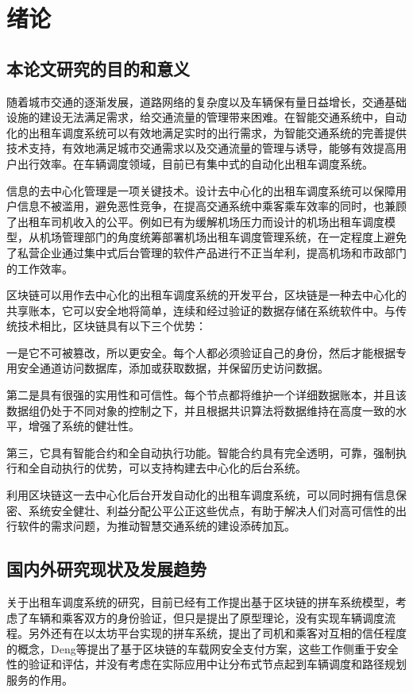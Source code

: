 \chapter{绪论}
\section{本论文研究的目的和意义}

随着城市交通的逐渐发展，道路网络的复杂度以及车辆保有量日益增长，交通基础设施的建设无法满足需求，给交通流量的管理带来困难。在智能交通系统中，自动化的出租车调度系统可以有效地满足实时的出行需求，为智能交通系统的完善提供技术支持，有效地满足城市交通需求以及交通流量的管理与诱导，能够有效提高用户出行效率。在车辆调度领域，目前已有集中式的自动化出租车调度系统。

信息的去中心化管理是一项关键技术。设计去中心化的出租车调度系统可以保障用户信息不被滥用，避免恶性竞争，在提高交通系统中乘客乘车效率的同时，也兼顾了出租车司机收入的公平。例如已有为缓解机场压力而设计的机场出租车调度模型，从机场管理部门的角度统筹部署机场出租车调度管理系统，在一定程度上避免了私营企业通过集中式后台管理的软件产品进行不正当牟利，提高机场和市政部门的工作效率。

区块链可以用作去中心化的出租车调度系统的开发平台，区块链是一种去中心化的共享账本，它可以安全地将简单，连续和经过验证的数据存储在系统软件中。与传统技术相比，区块链具有以下三个优势：

一是它不可被篡改，所以更安全。每个人都必须验证自己的身份，然后才能根据专用安全通道访问数据库，添加或获取数据，并保留历史访问数据。

第二是具有很强的实用性和可信性。每个节点都将维护一个详细数据账本，并且该数据组仍处于不同对象的控制之下，并且根据共识算法将数据维持在高度一致的水平，增强了系统的健壮性。

第三，它具有智能合约和全自动执行功能。智能合约具有完全透明，可靠，强制执行和全自动执行的优势，可以支持构建去中心化的后台系统。

利用区块链这一去中心化后台开发自动化的出租车调度系统，可以同时拥有信息保密、系统安全健壮、利益分配公平公正这些优点，有助于解决人们对高可信性的出行软件的需求问题，为推动智慧交通系统的建设添砖加瓦。


\section{国内外研究现状及发展趋势}
关于出租车调度系统的研究，目前已经有工作提出基于区块链的拼车系统模型，考虑了车辆和乘客双方的身份验证，但只是提出了原型理论，没有实现车辆调度流程。另外还有在以太坊平台实现的拼车系统，提出了司机和乘客对互相的信任程度的概念，Deng等提出了基于区块链的车载网安全支付方案，这些工作侧重于安全性的验证和评估，并没有考虑在实际应用中让分布式节点起到车辆调度和路径规划服务的作用。

